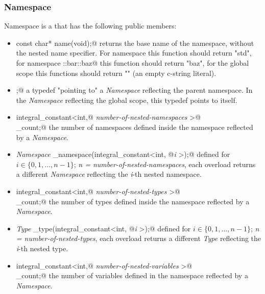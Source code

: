 \subsubsection{Namespace}

Namespace is a \verb@struct@ that has the following public members:

\begin{itemize}

\item{\verb@static const char* name(void);@} returns the base name
of the namespace, without the nested name specifier. For namespace
\verb@std@ this function should return "std", for namespace \verb@foo::bar::baz@
this function should return "baz", for the global scope this functions
should return "" (an empty c-string literal).

\item{ \verb@scope;@} a typedef "pointing to"
a {\em Namespace} reflecting the parent namespace. In the {\em Namespace}
reflecting the global scope, this typedef points to itself.

\item{\verb@typedef integral_constant<int,@ {\em number-of-nested-namespaces}
\verb@>@\\\verb@namespace_count;@} the number of namespaces defined inside
the namespace reflected by a {\em Namespace}.

\item{{\em Namespace} \verb@ith_namespace(integral_constant<int, @{\em i}
\verb@>);@} defined for $i \in \{0, 1, \dots, n-1\}$; {\em n = number-of-nested-namespaces},
each overload returns a different {\em Namespace} reflecting the {\em i}-th nested namespace.

\item{\verb@typedef integral_constant<int,@ {\em number-of-nested-types}
\verb@>@\\\verb@type_count;@} the number of types defined inside
the namespace reflected by a {\em Namespace}.

\item{{\em Type} \verb@ith_type(integral_constant<int, @{\em i}
\verb@>);@} defined for $i \in \{0, 1, \dots, n-1\}$; {\em n = number-of-nested-types},
each overload returns a different {\em Type} reflecting the {\em i}-th nested type.

\item{\verb@typedef integral_constant<int,@ {\em number-of-nested-variables}
\verb@>@\\\verb@variable_count;@} the number of variables defined in
the namespace reflected by a {\em Namespace}.


\end{itemize}
